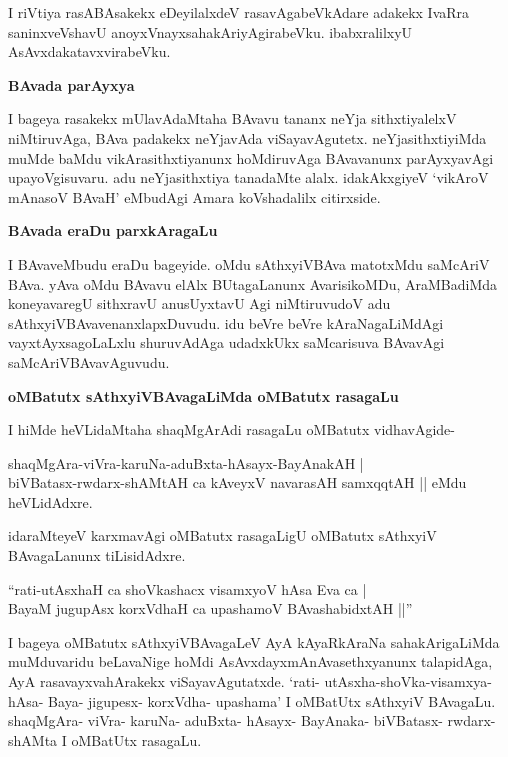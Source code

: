 I riVtiya rasABAsakekx eDeyilalxdeV rasavAgabeVkAdare adakekx IvaRra saninxveVshavU anoyxVnayxsaha\-kAriyAgirabeVku. ibabxralilxyU AsAvxdakatavxvirabeVku.

{\bigskip
\noindent
{\large\bf BAvada parAyxya}}\label{page230}
\medskip

\noindent
I bageya rasakekx mUlavAdaMtaha BAvavu tananx neYja sithxtiyalelxV niMtiruvAga, BAva padakekx neYja\-vAda viSayavAgutetx. neYjasithxtiyiMda muMde baMdu vikArasithxtiyanunx hoMdiruvAga BAva\-vanunx parAyxyavAgi upayoVgisuvaru. adu neYjasithxtiya tanadaMte alalx. idakAkxgiyeV `vikAroV mAna\-soV BAvaH'\label{230} eMbudAgi Amara koVshadalilx citirxside.

{\bigskip
\noindent
{\large\bf BAvada eraDu parxkAragaLu}}\label{page230}
\medskip

\noindent
I BAvaveMbudu eraDu bageyide. oMdu sAthxyiVBAva matotxMdu saMcAriV BAva. yAva oMdu BAvavu elAlx BUtagaLanunx AvarisikoMDu, AraMBadiMda koneyavaregU sithxravU anusUyx\-tavU Agi niMtiruvudoV adu sAthxyiVBAvavenanxlapxDuvudu. idu beVre beVre kAraNagaLiMdAgi vayxtAyxsa\-goLaLxlu shuruvAdAga udadxkUkx saMcarisuva BAvavAgi saMcAriVBAvavAguvudu.

{\bigskip
\noindent
{\large\bf oMBatutx sAthxyiVBAvagaLiMda oMBatutx rasagaLu}}\label{page230}
\medskip

\noindent
I hiMde heVLidaMtaha shaqMgArAdi rasagaLu oMBatutx vidhavAgide-

\begin{shloka}
shaqMgAra-viVra-karuNa-aduBxta-hAsayx-BayAnakAH |\\\label{230}
biVBatasx-rwdarx-shAMtAH ca kAveyxV navarasAH samxqqtAH || eMdu heVLidAdxre.
\end{shloka}

idaraMteyeV karxmavAgi oMBatutx rasagaLigU oMBatutx sAthxyiV BAvagaLanunx tiLisidAdxre.

\begin{shloka}
``rati-utAsxhaH ca shoVkashacx visamxyoV hAsa Eva ca |\\\label{230}
BayaM jugupAsx korxVdhaH ca upashamoV BAvashabidxtAH ||''
\end{shloka}

I bageya oMBatutx sAthxyiVBAvagaLeV AyA kAyaRkAraNa sahakArigaLiMda muMduvaridu beLa\-vaNige hoMdi AsAvxdayxmAnAvasethxyanunx talapidAga, AyA rasavayxvahArakekx viSayavAgutatxde. `rati-\- utAsxha-shoVka-visamxya- hAsa- Baya- jigupesx- korxVdha- upashama' I oMBatUtx sAthxyiV BAva\-gaLu. shaqMgAra- viVra- karuNa- aduBxta- hAsayx- BayAnaka- biVBatasx- rwdarx- shAMta I oMBatUtx rasagaLu.

